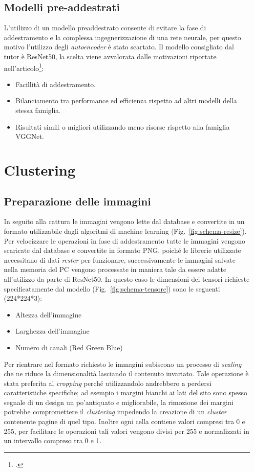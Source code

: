 \newpage

\subsection{Modelli pre-addestrati}
L'utilizzo di un modello preaddestrato consente di evitare la fase di addestramento e la complessa ingegnerizzazione di una rete neurale, per questo motivo l'utilizzo degli \emph{autoencoder} è stato scartato.
Il modello consigliato dal tutor è ResNet50, la scelta viene avvalorata dalle motivazioni riportate nell'articolo\footcite{site:why-resnet}:
\begin{itemize}
  \item Facillità di addestramento.
  \item Bilanciamento tra performance ed efficienza rispetto ad altri modelli della stessa famiglia.
  \item Risultati simili o migliori utilizzando meno risorse rispetto alla famiglia VGGNet. 
\end{itemize}

\section{Clustering}
\subsection{Preparazione delle immagini}
In seguito alla cattura le immagini vengono lette dal database e convertite in un formato utilizzabile dagli algoritmi di machine learning (Fig.~\ref{fig:schema-resize}).
Per velocizzare le operazioni in fase di addestramento tutte le immagini vengono scaricate dal database e convertite in formato PNG, poiché le librerie utilizzate necessitano di dati \emph{rester} per funzionare, successivamente le immagini salvate nella memoria del PC vengono processate in maniera tale da essere adatte all'utilizzo da parte di ResNet50.
In questo caso le dimensioni dei tensori richieste specificatamente dal modello (Fig.~\ref{fig:schema-tensore}) sono le seguenti (224*224*3):
\begin{itemize}
  \item Altezza dell'immagine
  \item Larghezza dell'immagine 
  \item Numero di canali (Red Green Blue)
\end{itemize}
Per rientrare nel formato richiesto le immagini subiscono un processo di \emph{scaling} che ne riduce la dimensionalità lasciando il contenuto invariato.
Tale operazione è stata preferita al \emph{cropping} perché utilizzandolo andrebbero a perdersi caratteristiche specifiche; ad esempio i margini bianchi ai lati del sito sono spesso segnale di un design un po'antiquato e migliorabile,  
la rimozione dei margini potrebbe compromettere il \emph{clustering} impedendo la creazione di un \emph{cluster} contenente pagine di quel tipo.
Inoltre ogni cella contiene valori compresi tra 0 e 255, per facilitare le operazioni tali valori vengono divisi per 255 e normalizzati in un intervallo compreso tra 0 e 1.

